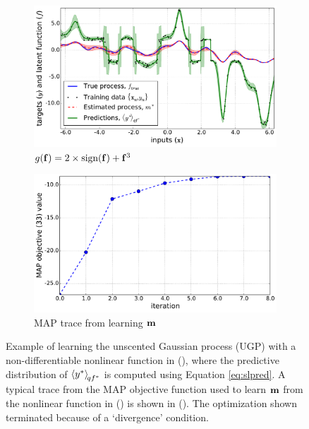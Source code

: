 \documentclass{article} %
\begin{document}
%
\begin{figure}[tb]
    \begin{subfigure}[b]{0.5\linewidth}
        \includegraphics[width=\linewidth]{fig/signdemo}
        \caption{$g\!\left({{\mathbf{f}}}\right) = 2\times\text{sign}\!\left({\mathbf{f}}\right)
            + \mathbf{f}^3$}
        \label{sub:sign}
    \end{subfigure}
    \begin{subfigure}[b]{0.5\linewidth}
        \includegraphics[width=\linewidth]{fig/trace}
        \caption{MAP trace from learning $\mathbf{m}$}
        \label{sub:mape}
        \vspace{0.5mm}
    \end{subfigure}

    \caption[]{Example of learning the unscented Gaussian process (UGP) with a
        non-differentiable nonlinear function in (), where %
        the predictive distribution of
        $\left\langle{\ensuremath{y}\ensuremath{^{*}}}\right\rangle_{\!{qf^{*}}}$ is computed using Equation \eqref{eq:slpred}.
        A typical trace from the MAP objective function used to learn $\mathbf{m}$
        from the nonlinear function in () is shown in
        (). The optimization shown terminated because of a
        `divergence' condition. %
        }

    \label{fig:learnex}
\end{figure}
\end{document}

